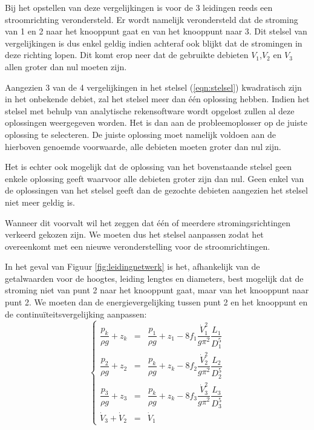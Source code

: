 Bij het opstellen van deze vergelijkingen is voor de 3 leidingen reeds een stroomrichting verondersteld. Er wordt namelijk verondersteld dat de stroming van 1 en 2 naar het knooppunt gaat en van het knooppunt naar 3. Dit stelsel van vergelijkingen is dus enkel geldig indien achteraf ook blijkt dat de stromingen in deze richting lopen. Dit komt erop neer dat de gebruikte debieten $V_1$,$V_2$ en $V_3$ allen groter dan nul moeten zijn.

Aangezien 3 van de 4 vergelijkingen in het stelsel (\ref{eqn:stelsel}) kwadratisch zijn in het onbekende debiet, zal het stelsel meer dan één oplossing hebben. Indien het stelsel met behulp van analytische rekensoftware wordt opgelost zullen al deze oplossingen weergegeven worden. Het is dan aan de probleemoplosser op de juiste oplossing te selecteren. De juiste oplossing moet namelijk voldoen aan de hierboven genoemde voorwaarde, alle debieten moeten groter dan nul zijn.

Het is echter ook mogelijk dat de oplossing van het bovenstaande stelsel geen enkele oplossing geeft waarvoor alle debieten groter zijn dan nul. Geen enkel van de oplossingen van het stelsel geeft dan de gezochte debieten aangezien het stelsel niet meer geldig is.

Wanneer dit voorvalt wil het zeggen dat één of meerdere stromingsrichtingen verkeerd gekozen zijn. We moeten dus het stelsel aanpassen zodat het overeenkomt met een nieuwe veronderstelling voor de stroomrichtingen.

In het geval van Figuur \ref{fig:leidingnetwerk} is het, afhankelijk van de getalwaarden voor de hoogtes, leiding lengtes en diameters, best mogelijk dat de stroming niet van punt 2 naar het knooppunt gaat, maar van het knooppunt naar punt 2. We moeten dan de energievergelijking tussen punt 2 en het knooppunt en de continuïteitsvergelijking aanpassen:
			\begin{equation}
				\left\{
				\begin{array}{lcl}
					\dfrac{p_k}{\rho g} + z_k &=& \dfrac{p_1}{\rho g} + z_1 - 8 f_1 \dfrac{\dot{V}_1^2}{g \pi^2} \dfrac{L_1}{D_1^5} \\
					\dfrac{p_2}{\rho g} + z_2 &=& \dfrac{p_k}{\rho g} + z_k - 8 f_2 \dfrac{\dot{V}_2^2}{g \pi^2} \dfrac{L_2}{D_2^5} \\
					\dfrac{p_3}{\rho g} + z_3 &=& \dfrac{p_k}{\rho g} + z_k - 8 f_3 \dfrac{\dot{V}_3^2}{g \pi^2} \dfrac{L_3}{D_3^5} \\
					\dot{V}_3 + \dot{V}_2 &=& \dot{V}_1 
				\end{array}
				\right.
				\label{eqn:stelsel2}
			\end{equation}

